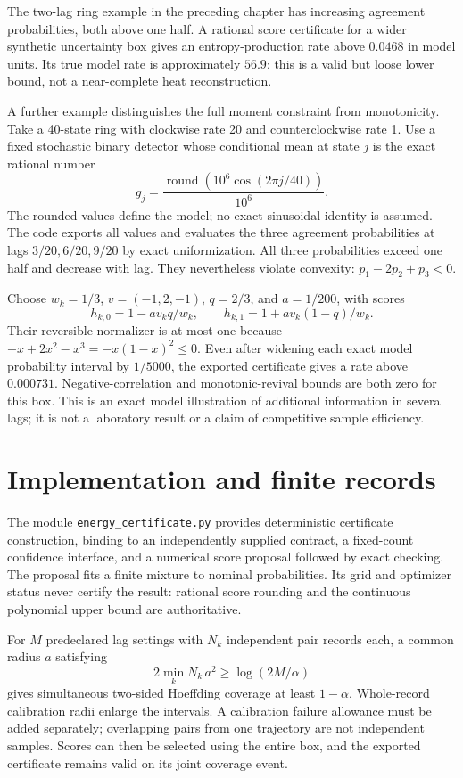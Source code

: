 The two-lag ring example in the preceding chapter has increasing agreement
probabilities, both above one half. A rational score certificate for a wider
synthetic uncertainty box gives an entropy-production rate above $0.0468$ in
model units. Its true model rate is approximately $56.9$: this is a valid but
loose lower bound, not a near-complete heat reconstruction.

A further example distinguishes the full moment constraint from monotonicity.
Take a 40-state ring with clockwise rate 20 and counterclockwise rate 1. Use a
fixed stochastic binary detector whose conditional mean at state $j$ is the
exact rational number
\[
 g_j=\frac{\operatorname{round}(10^6\cos(2\pi j/40))}{10^6}.
\]
The rounded values define the model; no exact sinusoidal identity is assumed.
The code exports all values and evaluates the three agreement probabilities at
lags $3/20,6/20,9/20$ by exact uniformization. All three probabilities exceed
one half and decrease with lag. They nevertheless violate convexity:
$p_1-2p_2+p_3<0$.

Choose $w_k=1/3$, $v=(-1,2,-1)$, $q=2/3$, and $a=1/200$, with scores
\[
 h_{k,0}=1-av_kq/w_k,\qquad
 h_{k,1}=1+av_k(1-q)/w_k.
\]
Their reversible normalizer is at most one because
$-x+2x^2-x^3=-x(1-x)^2\leq0$. Even after widening each exact model probability
interval by $1/5000$, the exported certificate gives a rate above $0.000731$.
Negative-correlation and monotonic-revival bounds are both zero for this box.
This is an exact model illustration of additional information in several lags;
it is not a laboratory result or a claim of competitive sample efficiency.

\section{Implementation and finite records}
The module \texttt{energy\_certificate.py} provides deterministic certificate
construction, binding to an independently supplied contract, a fixed-count
confidence interface, and a numerical score proposal followed by exact checking.
The proposal fits a finite mixture to nominal probabilities. Its grid and
optimizer status never certify the result: rational score rounding and the
continuous polynomial upper bound are authoritative.

For $M$ predeclared lag settings with $N_k$ independent pair records each,
a common radius $a$ satisfying
\[
 2\min_k N_k\,a^2\geq\log(2M/\alpha)
\]
gives simultaneous two-sided Hoeffding coverage at least $1-\alpha$.
Whole-record calibration radii enlarge the intervals. A calibration failure
allowance must be added separately; overlapping pairs from one trajectory are
not independent samples. Scores can then be selected using the entire box,
and the exported certificate remains valid on its joint coverage event.

